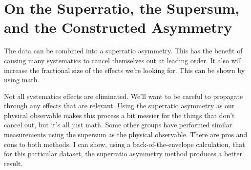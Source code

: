 \section{On the Superratio, the Supersum, and the Constructed Asymmetry}

The data can be combined into a superratio asymmetry.  This has the benefit of causing many systematics to cancel themselves out at leading order.  It also will increase the fractional size of the effects we're looking for.  This can be shown by using math.  

Not all systematics effects are eliminated.  We'll want to be careful to propagate through any effects that are relevant.  Using the superratio asymmetry as our physical observable makes this process a bit messier for the things that don't cancel out, but it's all just math.  
Some other groups have performed similar measurements using the supersum as the physical observable.  There are pros and cons to both methods.  I can show, using a back-of-the-envelope calculation, that for this particular dataset, the superratio asymmetry method produces a better result.  


